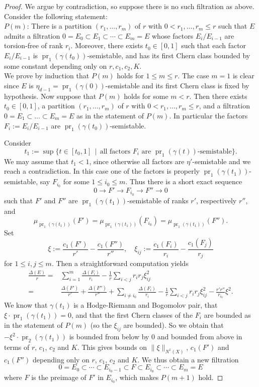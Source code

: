 \documentclass[a4,reqno]{amsart}
\theoremstyle{definition}
\DeclareMathOperator{\pr}{pr}
\numberwithin{equation}{section}
\begin{document}
\begin{proof}
We argue by contradiction, so suppose there is no such filtration as above. Consider the following statement:\\

$P(m)$: There is a partition $(r_1,\ldots,r_m)$ of $r$ with $0 < r_1, \ldots, r_m \le r$ such that $E$ admits a filtration $0 = E_0 \subset E_1 \subset \cdots \subset E_m =E$ whose factors $E_i/E_{i-1}$ are torsion-free of rank $r_i$. Moreover, there exists $t_0 \in [0,1]$ such that each factor $E_i/E_{i-1}$ is $\pr_1(\gamma(t_0))$-semistable, and has its first Chern class bounded by some constant depending only on $r, c_1, c_2, K$.\\

We prove by induction that $P(m)$ holds for $1 \le m \le r$. The case $m = 1$ is clear since $E$ is $\eta_{d-1} = \pr_1(\gamma(0))$-semistable and its first Chern class is fixed by hypothesis. Now suppose that $P(m)$ holds for some $m< r$. Then there exists $t_0 \in [0,1]$, a partition $(r_1,\ldots,r_m)$ of $r$ with $0 < r_1, \ldots, r_m \le r$, and a filtration $0 = E_1 \subset \ldots \subset E_m =E$ as in the statement of $P(m)$. In particular the factors $F_i := E_i/E_{i-1}$ are $\pr_1(\gamma(t_0))$-semistable. 

Consider
\[
    t_1 := \sup \{ t \in [t_0,1] \, \mid \, \text{all factors $F_i$ are $\pr_1(\gamma(t))$-semistable} \}.
\]
We may assume that $t_1 < 1$, since otherwise all factors are $\eta'$-semistable and we reach a contradiction. In this case one of the factors is properly $\pr_1(\gamma(t_1))$-semistable, say $F_{i_0}$ for some $1 \le i_0 \le m$. Thus there is a short exact sequence
\[
    0 \to F' \to F_{i_0} \to F'' \to 0
\]
such that $F'$ and $F''$ are $\pr_1(\gamma(t_1))$-semistable of ranks $r'$, respectively $r''$, and $$\mu_{\pr_1(\gamma(t_1))}(F') = \mu_{\pr_1(\gamma(t_1))}(F_{i_0}) = \mu_{\pr_1(\gamma(t_1))}(F'').$$
Set
\[
    \xi := \frac{c_1(F')}{r'} - \frac{c_1(F'')}{r''}, \quad \xi_{ij} := \frac{c_1(F_i)}{r_i} - \frac{c_1(F_j)}{r_j}
\]
for $1 \le i,j \le m$. Then a straightforward computation yields
\begin{align*}
        \frac{\Delta(E)}{r} ={}& \sum_{i=1}^m \frac{\Delta(F_i)}{r_i} - \frac{1}{r} \sum_{i < j} r_i r_j \xi_{ij}^2 \\
        ={}& \frac{\Delta(F')}{r'} + \frac{\Delta(F'')}{r''} + \sum_{i \neq i_0} \frac{\Delta(F_i)}{r_i} - \frac{1}{r} \sum_{i < j} r_i r_j \xi_{ij}^2  - \frac{r'r''}{r_{i_0}} \xi^2.
\end{align*}
We know that $\gamma(t_1)$ is a Hodge-Riemann and Bogomolov pair, that $\xi \cdot \pr_1(\gamma(t_1)) = 0$, 
and that the first Chern classes of the $F_i$ are bounded as in the statement of $P(m)$ (so the $\xi_{ij}$ are bounded).  So we obtain that $
-\xi^2 \cdot \pr_2(\gamma(t_1))$ is bounded from below by $0$ and bounded from above in terms of $r$, $c_1$, $c_2$ and $K$. This gives bounds on $\|\xi\|_{N^1(X)}$, $c_1(F')$ and $c_1(F'')$ depending only on $r$, $c_1$, $c_2$ and $K$. We thus obtain a new filtration 
\[
    0 = E_0 \subset \cdots\subset E_{i_0-1} \subset F \subset E_{i_0} \subset \cdots \subset E_m = E
\]
where $F$ is the preimage of $F'$ in $E_{i_0}$, which makes $P(m+1)$ hold.


\end{proof}
\end{document}
